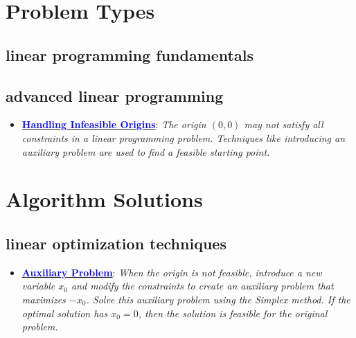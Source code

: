 \documentclass{article}%
\begin{document}
\section{Problem Types}%
\label{sec:ProblemTypes}%
\begin{itemize}[leftmargin=*]%
\subsection{linear programming fundamentals}%
\label{subsec:linearprogrammingfundamentals}%
\begin{itemize}[leftmargin=*]%
%
\end{itemize}

%
\subsection{advanced linear programming}%
\label{subsec:advancedlinearprogramming}%
\begin{itemize}[leftmargin=*]%
\item \href{https://www.math.purdue.edu/~yipn/421/2024-08-27-ExSimplex.pdf#page=30}{\textbf{\textcolor{blue}{Handling Infeasible Origins}}}: \emph{The origin $(0, 0)$ may not satisfy all constraints in a linear programming problem. Techniques like introducing an auxiliary problem are used to find a feasible starting point.}%
\end{itemize}

%
\end{itemize}%
\newpage

%
\section{Algorithm Solutions}%
\label{sec:AlgorithmSolutions}%
\begin{itemize}[leftmargin=*]%
\subsection{linear optimization techniques}%
\label{subsec:linearoptimizationtechniques}%
\begin{itemize}[leftmargin=*]%
\item \href{https://www.math.purdue.edu/~yipn/421/2024-08-27-ExSimplex.pdf#page=32}{\textbf{\textcolor{blue}{Auxiliary Problem}}}: \emph{When the origin is not feasible, introduce a new variable $x_0$ and modify the constraints to create an auxiliary problem that maximizes $-x_0$. Solve this auxiliary problem using the Simplex method. If the optimal solution has $x_0 = 0$, then the solution is feasible for the original problem.}%
\end{itemize}

%
\end{itemize}%
\newpage

%
\end{document}
